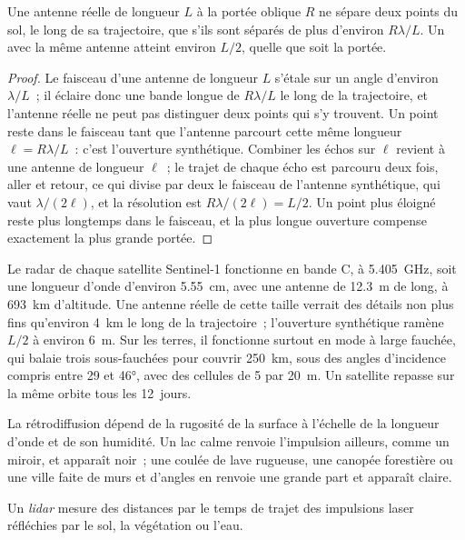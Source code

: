 \begin{proposition}\label{prop:b3:remote-sensing-gis:azimuth}
Une antenne réelle de longueur $L$ à la portée oblique $R$ ne sépare deux points du
sol, le long de sa trajectoire, que s'ils sont séparés de plus d'environ
$R\lambda/L$. Un  avec la même antenne atteint environ $L/2$,
quelle que soit la portée.
\end{proposition}

\begin{proof}
Le faisceau d'une antenne de longueur $L$ s'étale sur un angle
d'environ $\lambda/L$~; il éclaire donc une bande longue de $R\lambda/L$ le long
de la trajectoire, et l'antenne réelle ne peut pas distinguer deux points qui s'y trouvent. Un point reste
dans le faisceau tant que l'antenne parcourt cette même longueur $\ell = R\lambda/L$~:
c'est l'ouverture synthétique. Combiner les échos sur $\ell$ revient
à une antenne de longueur $\ell$~; le trajet de chaque écho est parcouru
deux fois, aller et retour, ce qui divise par deux le faisceau de l'antenne
synthétique, qui vaut $\lambda/(2\ell)$, et la résolution est $R\lambda/(2\ell) =
L/2$. Un point plus éloigné reste plus longtemps dans le faisceau, et la
plus longue ouverture compense exactement la plus grande portée.
\end{proof}

Le radar de chaque satellite Sentinel-1 fonctionne en bande C, à
\qty{5.405}{GHz}, soit une longueur d'onde d'environ \qty{5.55}{cm}, avec une antenne
de \qty{12.3}{m} de long, à \qty{693}{km} d'altitude. Une antenne réelle de cette
taille verrait des détails non plus fins qu'environ \qty{4}{km} le long de la trajectoire~; l'ouverture synthétique
ramène $L/2$ à environ \qty{6}{m}. Sur les terres, il fonctionne surtout en
mode à large fauchée, qui balaie trois sous-fauchées pour couvrir \qty{250}{km}, sous
des angles d'incidence compris entre 29 et \ang{46}, avec des cellules de 5 par
\qty{20}{m}. Un satellite repasse sur la même orbite tous les \num{12}~jours.

La rétrodiffusion dépend de la rugosité de la surface à l'échelle de la
longueur d'onde et de son humidité. Un lac calme renvoie l'impulsion ailleurs, comme
un miroir, et apparaît noir~; une coulée de lave rugueuse, une canopée forestière ou une ville
faite de murs et d'angles en renvoie une grande part et apparaît claire.

\begin{definition}[Lidar]\label{def:b3:remote-sensing-gis:lidar}
Un \emph{lidar} mesure des distances par le temps de trajet des impulsions laser
réfléchies par le sol, la végétation ou l'eau.
\end{definition}

